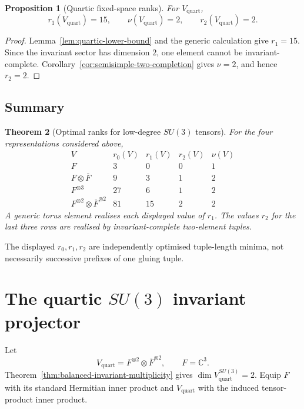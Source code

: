 \documentclass[11pt]{article}
\theoremstyle{plain}
\newtheorem{theorem}{Theorem}[section]
\newtheorem{proposition}[theorem]{Proposition}
\theoremstyle{definition}
\begin{document}
\begin{proposition}[Quartic fixed-space ranks]
\label{prop:SU3-quartic-nu}
For \(V_{\mathrm{quart}}\),
\[
r_1(V_{\mathrm{quart}})=15,
\qquad
\nu(V_{\mathrm{quart}})=2,
\qquad
r_2(V_{\mathrm{quart}})=2.
\]
\end{proposition}

\begin{proof}
Lemma~\ref{lem:quartic-lower-bound} and the generic calculation give \(r_1=15\). Since the invariant sector has dimension \(2\), one element cannot be invariant-complete. Corollary~\ref{cor:semisimple-two-completion} gives \(\nu=2\), and hence \(r_2=2\).
\end{proof}

\subsection{Summary}

\begin{theorem}[Optimal ranks for low-degree \texorpdfstring{\(SU(3)\)}{SU(3)} tensors]
\label{thm:SU3-rank-collapse}
For the four representations considered above,
\[
\begin{array}{c|c|c|c|c}
V
&
r_0(V)
&
r_1(V)
&
r_2(V)
&
\nu(V)
\\
\hline
F
&
3&0&0&1
\\[1mm]
F\otimes\overline F
&
9&3&1&2
\\[1mm]
F^{\otimes3}
&
27&6&1&2
\\[1mm]
F^{\otimes2}\otimes\overline F^{\otimes2}
&
81&15&2&2
\end{array}
\]
A generic torus element realises each displayed value of \(r_1\). The values \(r_2\) for the last three rows are realised by invariant-complete two-element tuples.
\end{theorem}

The displayed \(r_0,r_1,r_2\) are independently optimised tuple-length minima, not necessarily successive prefixes of one gluing tuple.

\section{The quartic \texorpdfstring{\(SU(3)\)}{SU(3)} invariant projector}
\label{sec:SU3-quartic-projector}

Let
\[
V_{\mathrm{quart}}
=
F^{\otimes2}\otimes\overline F^{\otimes2},
\qquad
F=\mathbb C^3.
\]
Theorem~\ref{thm:balanced-invariant-multiplicity} gives
\(\dim V_{\mathrm{quart}}^{SU(3)}=2\).
Equip \(F\) with its standard Hermitian inner product and \(V_{\mathrm{quart}}\) with the induced tensor-product inner product.
\end{document}
